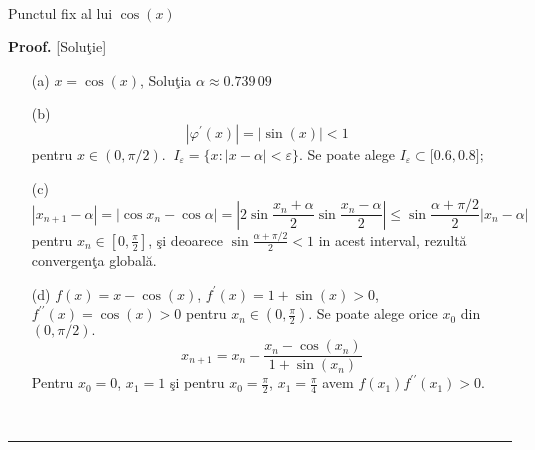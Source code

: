\documentclass{article}%
\newenvironment{proof}[1][Proof]{\noindent\textbf{#1.} }{\ \rule{0.5em}{0.5em}}
\begin{document}
%

\begin{center}
\\
Punctul fix al lui $\cos(x)$%
\label{fig1}%
\end{center}


\begin{proof}
[Solu\c{t}ie]

\begin{enumerate}
\item[(a)] $x=\cos(x)$, Solu\c{t}ia $\alpha\approx0.739\,09\allowbreak$

\item[(b)]
\[
|\varphi^{\prime}(x)|=|\sin(x)|<1\text{ }%
\]
pentru $x\in(0,\pi/2)$. $\ I_{\varepsilon}=\{x:|x-\alpha|<\varepsilon\}$. Se
poate alege $I_{\varepsilon}\subset\lbrack0.6,0.8];$

\item[(c)]
\[
\left\vert x_{n+1}-\alpha\right\vert =\left\vert \cos x_{n}-\cos
\alpha\right\vert =\left\vert 2\sin\frac{x_{n}+\alpha}{2}\sin\frac
{x_{n}-\alpha}{2}\right\vert \leq\sin\frac{\alpha+\pi/2}{2}\left\vert
x_{n}-\alpha\right\vert
\]
pentru $x_{n}\in\left[  0,\frac{\pi}{2}\right]  $, \c{s}i deoarece $\sin
\frac{\alpha+\pi/2}{2}<1$ in acest interval, rezult\u{a} convergen\c{t}a global\u{a}.

\item[(d)] $f(x)=x-\cos(x)$, $f^{\prime}(x)=1+\sin(x)>0$, $f^{\prime\prime
}(x)=\cos(x)>0$ pentru $x_{n}\in\left(  0,\frac{\pi}{2}\right)  $. Se poate
alege orice $x_{0}$ din $(0,\pi/2).$%
\[
x_{n+1}=x_{n}-\frac{x_{n}-\cos(x_{n})}{1+\sin(x_{n})}%
\]
Pentru $x_{0}=0$, $x_{1}=1$ \c{s}i pentru $x_{0}=\frac{\pi}{2}$, $x_{1}%
=\frac{\pi}{4}$ avem $f(x_{1})f^{\prime\prime}(x_{1})>0.$
\end{enumerate}
\end{proof}
\end{document}
